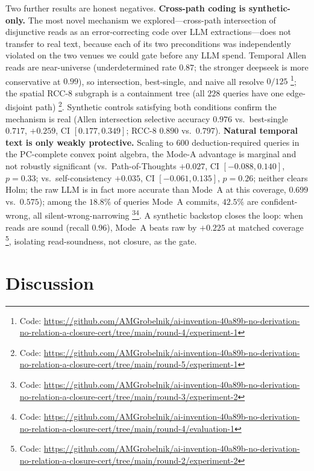 \documentclass[11pt,letterpaper]{article}
\begin{document}
Two further results are honest negatives. \textbf{Cross-path coding is synthetic-only.} The most novel mechanism we explored---cross-path intersection of disjunctive reads as an error-correcting code over LLM extractions---does not transfer to real text, because each of its two preconditions was independently violated on the two venues we could gate before any LLM spend. Temporal Allen reads are near-universe (underdetermined rate $0.87$; the stronger deepseek is more conservative at $0.99$), so intersection, best-single, and naive all resolve $0/125$ \footnote{Code: \url{https://github.com/AMGrobelnik/ai-invention-40a89b-no-derivation-no-relation-a-closure-cert/tree/main/round-4/experiment-1}}; the spatial RCC-8 subgraph is a containment tree (all $228$ queries have one edge-disjoint path) \footnote{Code: \url{https://github.com/AMGrobelnik/ai-invention-40a89b-no-derivation-no-relation-a-closure-cert/tree/main/round-5/experiment-1}}. Synthetic controls satisfying both conditions confirm the mechanism is real (Allen intersection selective accuracy $0.976$ vs.\ best-single $0.717$, $+0.259$, CI $[0.177,0.349]$; RCC-8 $0.890$ vs.\ $0.797$). \textbf{Natural temporal text is only weakly protective.} Scaling to $600$ deduction-required queries in the PC-complete convex point algebra, the Mode-A advantage is marginal and not robustly significant (vs.\ Path-of-Thoughts $+0.027$, CI $[-0.088,0.140]$, $p{=}0.33$; vs.\ self-consistency $+0.035$, CI $[-0.061,0.135]$, $p{=}0.26$; neither clears Holm; the raw LLM is in fact more accurate than Mode~A at this coverage, $0.699$ vs.\ $0.575$); among the $18.8\%$ of queries Mode~A commits, $42.5\%$ are confident-wrong, all silent-wrong-narrowing \footnote{Code: \url{https://github.com/AMGrobelnik/ai-invention-40a89b-no-derivation-no-relation-a-closure-cert/tree/main/round-3/experiment-2}}\footnote{Code: \url{https://github.com/AMGrobelnik/ai-invention-40a89b-no-derivation-no-relation-a-closure-cert/tree/main/round-4/evaluation-1}}. A synthetic backstop closes the loop: when reads are sound (recall $0.96$), Mode~A beats raw by $+0.225$ at matched coverage \footnote{Code: \url{https://github.com/AMGrobelnik/ai-invention-40a89b-no-derivation-no-relation-a-closure-cert/tree/main/round-2/experiment-2}}, isolating read-soundness, not closure, as the gate.

\section{Discussion}
\label{sec:discussion}
\end{document}
